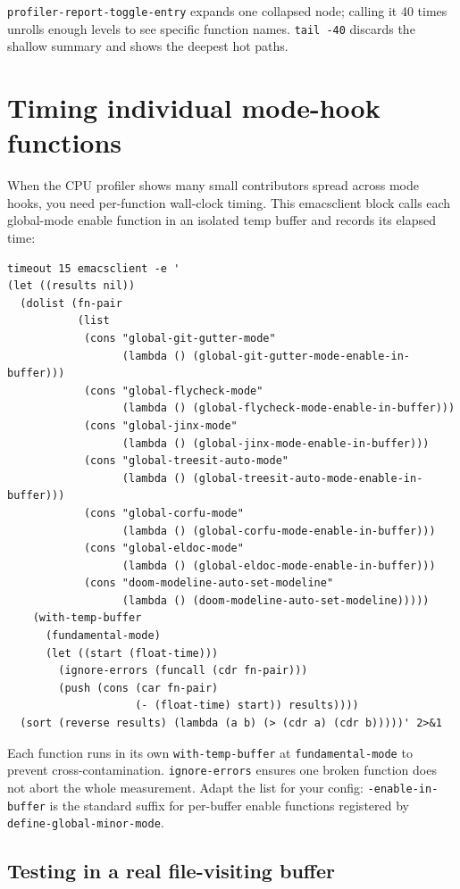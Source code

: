 \texttt{profiler-report-toggle-entry} expands one collapsed node; calling it 40 times unrolls enough levels to see specific function names. \texttt{tail -40} discards the shallow summary and shows the deepest hot paths.

\section{Timing individual mode-hook functions}\label{timing-individual-mode-hook-functions}

When the CPU profiler shows many small contributors spread across mode hooks, you need per-function wall-clock timing. This emacsclient block calls each global-mode enable function in an isolated temp buffer and records its elapsed time:

\begin{verbatim}
timeout 15 emacsclient -e '
(let ((results nil))
  (dolist (fn-pair
           (list
            (cons "global-git-gutter-mode"
                  (lambda () (global-git-gutter-mode-enable-in-buffer)))
            (cons "global-flycheck-mode"
                  (lambda () (global-flycheck-mode-enable-in-buffer)))
            (cons "global-jinx-mode"
                  (lambda () (global-jinx-mode-enable-in-buffer)))
            (cons "global-treesit-auto-mode"
                  (lambda () (global-treesit-auto-mode-enable-in-buffer)))
            (cons "global-corfu-mode"
                  (lambda () (global-corfu-mode-enable-in-buffer)))
            (cons "global-eldoc-mode"
                  (lambda () (global-eldoc-mode-enable-in-buffer)))
            (cons "doom-modeline-auto-set-modeline"
                  (lambda () (doom-modeline-auto-set-modeline)))))
    (with-temp-buffer
      (fundamental-mode)
      (let ((start (float-time)))
        (ignore-errors (funcall (cdr fn-pair)))
        (push (cons (car fn-pair)
                    (- (float-time) start)) results))))
  (sort (reverse results) (lambda (a b) (> (cdr a) (cdr b)))))' 2>&1
\end{verbatim}

Each function runs in its own \texttt{with-temp-buffer} at \texttt{fundamental-mode} to prevent cross-contamination. \texttt{ignore-errors} ensures one broken function does not abort the whole measurement. Adapt the list for your config: \texttt{-enable-in-buffer} is the standard suffix for per-buffer enable functions registered by \texttt{define-global-minor-mode}.

\subsection{Testing in a real file-visiting buffer}\label{testing-in-a-real-file-visiting-buffer}


